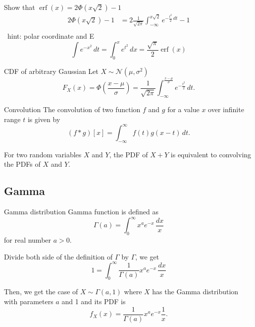 \documentclass[11pt,a4paper,fleqn]{article}
\numberwithin{equation}{section}
\DeclareMathOperator\Erf{\ensuremath{\text{erf}}}
\newcommand{\TODO}{\textcolor{ErrorRed}{\fbox{TODO}}\ }
\begin{document}
\begin{exec}
    Show that $\Erf(x)=2\Phi(x\sqrt{2})-1$
    \tcblower
    \TODO
    \begin{align*}
        2\Phi(x\sqrt{2})-1
        &= 2\frac{1}{\sqrt{2\pi}}\int_{-\infty}^{x\sqrt{2}}e^{-\frac{t^2}{2}\,dt}-1\\
    \end{align*}
    \TODO hint: polar coordinate and E
    \begin{equation*}
        \int e^{-x^2}\,dt = \int_{0}^{x} e^{t^2}\,dx = \frac{\sqrt{\pi}}{2}\Erf(x)
    \end{equation*}
\end{exec}

\begin{fact}{CDF of arbitrary Gaussian}{}
    Let $X\sim \mathcal{N}(\mu, \sigma^2)$
    \begin{equation*}
        F_X(x)=\Phi(\frac{x-\mu}{\sigma}) = \frac{1}{\sqrt{2\pi}}\int_{-\infty}^{\frac{x-\mu}{\sigma}} e^{-\frac{t^2}{2}}\,dt.
    \end{equation*}
\end{fact}

\begin{fact}{Convolution}{}
    The convolution of two function $f$ and $g$ for a value $x$ over infinite range $t$ is given by
    \begin{equation*}
        (f*g)[x] = \int_{-\infty}^{\infty}f(t)g(x-t)\,dt.
    \end{equation*}
\end{fact}

For two random variables $X$ and $Y$, the PDF of $X+Y$ is equivalent to convolving the PDFs of $X$ and $Y$.

\subsection{Gamma}

\begin{fact}{Gamma distribution}{}
Gamma function is defined as
\begin{equation*}
    \Gamma(a)=\int_{0}^{\infty} x^a e^{-x}\,\frac{dx}{x}
\end{equation*}
for real number $a>0$.

Divide both side of the definition of $\Gamma$ by $\Gamma$, we get
\begin{equation*}
    1=\int_{0}^{\infty} \frac{1}{\Gamma(a)}x^a e^{-x}\,\frac{dx}{x}
\end{equation*}

Then, we get the case of $X \sim \Gamma(a,1)$ where $X$ has the Gamma distribution with parameters $a$ and 1 and its PDF is
\begin{equation}
    f_X(x)=\frac{1}{\Gamma(a)}x^a e^{-x}\frac{1}{x}.
\end{equation}

\end{fact}
\end{document}
